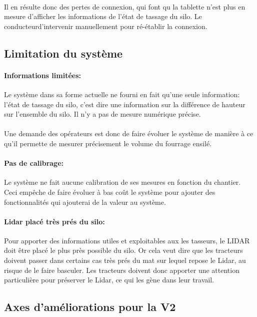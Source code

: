 \documentclass[12pt,a4paper]{report}
\begin{document}
\paragraph{} Il en résulte donc des pertes de connexion, qui font qu la tablette n'est plus en mesure d'afficher les informations de l'état de tassage du silo. Le conducteurd'intervenir manuellement pour ré-établir la connexion. 


\subsection{Limitation du système}
\paragraph{Informations limitées:} Le système dans sa forme actuelle ne fourni en fait qu'une seule information: l'état de tassage du silo, c'est dire une information sur la différence de hauteur sur l'ensemble du silo. Il n'y a pas de mesure numérique précise.

\paragraph{} Une demande des opérateurs est donc de faire évoluer le système de manière à ce qu'il permette de mesurer précisement le volume du fourrage ensilé.

\paragraph{Pas de calibrage:} Le système ne fait aucune calibration de ses mesures en fonction du chantier. Ceci empêche de faire évoluer à bas coût le système pour ajouter des fonctionnalités qui ajouterai de la valeur au système.

\paragraph{Lidar placé très prés du silo:} Pour apporter des informations utiles et exploitables aux les tasseurs, le LIDAR doit être placé le plus près possible du silo. Or cela veut dire que les tracteurs doivent passer dans certains cas très prés du mat sur lequel repose le Lidar, au risque de le faire basculer. Les tracteurs doivent donc apporter une attention particulière pour préserver le Lidar, ce qui les gène dans leur travail.

\subsection{Axes d'améliorations pour la V2}
\end{document}
